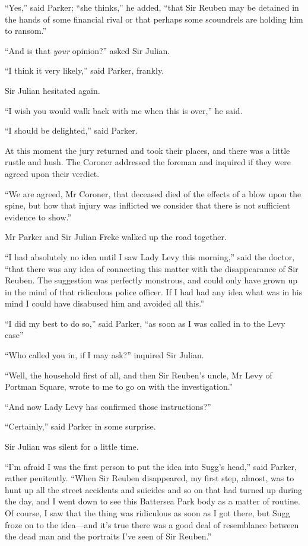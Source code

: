 \enquote{Yes,} said Parker; \enquote{she thinks,} he added, \enquote{that Sir Reuben may be detained in the hands of some financial rival or that perhaps some scoundrels are holding him to ransom.}

\enquote{And is that \textit{your} opinion?} asked Sir Julian.

\enquote{I think it very likely,} said Parker, frankly.

Sir Julian hesitated again.

\enquote{I wish you would walk back with me when this is over,} he said.

\enquote{I should be delighted,} said Parker.

At this moment the jury returned and took their places, and there was a little rustle and hush. The Coroner addressed the foreman and inquired if they were agreed upon their verdict.

\enquote{We are agreed, Mr Coroner, that deceased died of the effects of a blow upon the spine, but how that injury was inflicted we consider that there is not sufficient evidence to show.}

Mr Parker and Sir Julian Freke walked up the road together.

\enquote{I had absolutely no idea until I saw Lady Levy this morning,} said the doctor, \enquote{that there was any idea of connecting this matter with the disappearance of Sir Reuben. The suggestion was perfectly monstrous, and could only have grown up in the mind of that ridiculous police officer. If I had had any idea what was in his mind I could have disabused him and avoided all this.}

\enquote{I did my best to do so,} said Parker, \enquote{as soon as I was called in to the Levy case\longdash}

\enquote{Who called you in, if I may ask?} inquired Sir Julian.

\enquote{Well, the household first of all, and then Sir Reuben’s uncle, Mr Levy of Portman Square, wrote to me to go on with the investigation.}

\enquote{And now Lady Levy has confirmed those instructions?}

\enquote{Certainly,} said Parker in some surprise.

Sir Julian was silent for a little time.

\enquote{I’m afraid I was the first person to put the idea into Sugg’s head,} said Parker, rather penitently. \enquote{When Sir Reuben disappeared, my first step, almost, was to hunt up all the street accidents and suicides and so on that had turned up during the day, and I went down to see this Battersea Park body as a matter of routine. Of course, I saw that the thing was ridiculous as soon as I got there, but Sugg froze on to the idea\allowbreak---\allowbreak and it’s true there was a good deal of resemblance between the dead man and the portraits I’ve seen of Sir Reuben.}

